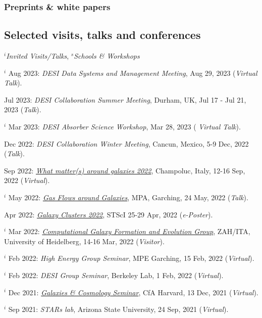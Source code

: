 \documentclass[12pt,letterpaper]{article}
\begin{document}
  \subsubsection{Preprints \& white papers}
  \begin{list}{}{\cvlist}
    
  \end{list}
\fi

\subsection{Selected visits, talks and conferences}
$^i$\emph{Invited Visits/Talks}, $^s$\emph{Schools \& Workshops}
\begin{list}{}{\cvlist}
\item $^i$ Aug 2023:  \emph{DESI Data Systems and Management Meeting}, Aug 29, 2023 (\textit{Virtual Talk}). 
\item Jul 2023:  \emph{DESI Collaboration Summer Meeting}, Durham, UK, Jul 17 - Jul 21, 2023 (\textit{Talk}). 
\item $^i$ Mar 2023:  \emph{DESI Absorber Science Workshop}, Mar 28, 2023 (\textit{ Virtual Talk}).   
\item Dec 2022:  \emph{DESI Collaboration Winter Meeting}, Cancun, Mexico, 5-9 Dec, 2022 (\textit{Talk}).   
\item Sep 2022:  \emph{\href{https://sites.google.com/unimib.it/gas2022/home}{What matter(s) around galaxies 2022}}, Champoluc, Italy, 12-16 Sep, 2022 (\textit{Virtual}).   
\item $^i$ May 2022:  \emph{\href{https://indico.ph.tum.de/event/7018/}{Gas Flows around Galaxies}}, MPA, Garching, 24 May, 2022 (\textit{Talk}).   
\item Apr 2022:  \emph{\href{https://www.stsci.edu/contents/events/stsci/2022/april/galaxy-clusters-2022-challenging-our-cosmological-perspectives}{Galaxy Clusters 2022}}, STScI 25-29 Apr, 2022 (\textit{e-Poster}).   
\item $^i$ Mar 2022:  \emph{\href{https://zah.uni-heidelberg.de/research-groups\#c2659}{Computational Galaxy Formation and Evolution Group}}, ZAH/ITA, University of Heidelberg, 14-16 Mar, 2022 (\textit{Visitor}).   
\item $^i$ Feb 2022:  \emph{High Energy Group Seminar}, MPE Garching, 15 Feb, 2022 (\textit{Virtual}).   
\item $^i$ Feb 2022:  \emph{DESI Group Seminar}, Berkeley Lab, 1 Feb, 2022 (\textit{Virtual}).   
\item $^i$ Dec 2021:  \emph{\href{https://pweb.cfa.harvard.edu/calendar/event/9298}{Galaxies \& Cosmology Seminar}}, CfA Harvard, 13 Dec, 2021 (\textit{Virtual}).   
\item $^i$ Sep 2021:  \textit{STARs lab}, Arizona State University, 24 Sep, 2021 (\textit{Virtual}).   


\end{list}
\end{document}

